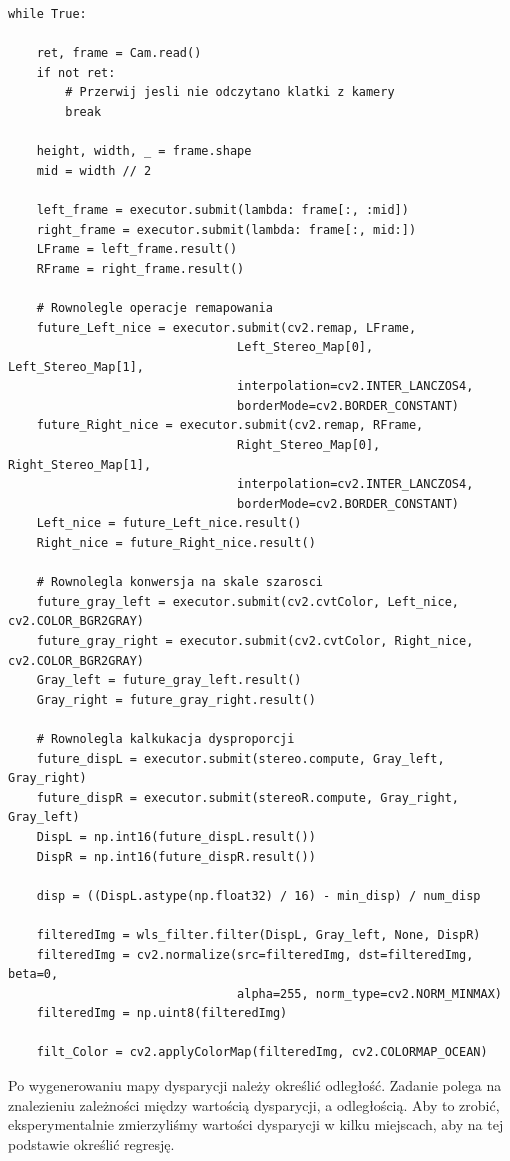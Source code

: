 \documentclass[magisterska]{pracadypl}
\begin{document}
\begin{lstlisting}[style=mypython]
while True:

    ret, frame = Cam.read()
    if not ret:
        # Przerwij jesli nie odczytano klatki z kamery
        break

    height, width, _ = frame.shape
    mid = width // 2

    left_frame = executor.submit(lambda: frame[:, :mid])
    right_frame = executor.submit(lambda: frame[:, mid:])
    LFrame = left_frame.result()
    RFrame = right_frame.result()

    # Rownolegle operacje remapowania 
    future_Left_nice = executor.submit(cv2.remap, LFrame,
                                Left_Stereo_Map[0], Left_Stereo_Map[1],
                                interpolation=cv2.INTER_LANCZOS4,
                                borderMode=cv2.BORDER_CONSTANT)
    future_Right_nice = executor.submit(cv2.remap, RFrame,
                                Right_Stereo_Map[0], Right_Stereo_Map[1],
                                interpolation=cv2.INTER_LANCZOS4,
                                borderMode=cv2.BORDER_CONSTANT)
    Left_nice = future_Left_nice.result()
    Right_nice = future_Right_nice.result()

    # Rownolegla konwersja na skale szarosci
    future_gray_left = executor.submit(cv2.cvtColor, Left_nice, cv2.COLOR_BGR2GRAY)
    future_gray_right = executor.submit(cv2.cvtColor, Right_nice, cv2.COLOR_BGR2GRAY)
    Gray_left = future_gray_left.result()
    Gray_right = future_gray_right.result()

    # Rownolegla kalkukacja dysproporcji
    future_dispL = executor.submit(stereo.compute, Gray_left, Gray_right)
    future_dispR = executor.submit(stereoR.compute, Gray_right, Gray_left)
    DispL = np.int16(future_dispL.result())
    DispR = np.int16(future_dispR.result())

    disp = ((DispL.astype(np.float32) / 16) - min_disp) / num_disp

    filteredImg = wls_filter.filter(DispL, Gray_left, None, DispR)
    filteredImg = cv2.normalize(src=filteredImg, dst=filteredImg, beta=0, 
                                alpha=255, norm_type=cv2.NORM_MINMAX)
    filteredImg = np.uint8(filteredImg)

    filt_Color = cv2.applyColorMap(filteredImg, cv2.COLORMAP_OCEAN)
\end{lstlisting}

Po wygenerowaniu mapy dysparycji należy określić odległość. Zadanie polega na znalezieniu zależności między wartością dysparycji, a odległością. Aby to zrobić, eksperymentalnie zmierzyliśmy wartości dysparycji w kilku miejscach, aby na tej podstawie określić regresję.
\end{document}
